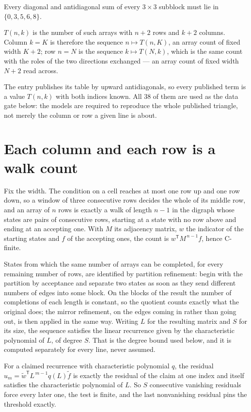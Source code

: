 \documentclass[11pt]{article}
\theoremstyle{definition}
\begin{document}
Every diagonal and antidiagonal sum of every $3\times3$ subblock must lie in $\{0, 3, 5, 6, 8\}$.

$T(n,k)$ is the number of such arrays with $n + 2$ rows and $k + 2$ columns. Column $k = K$ is therefore the sequence $n \mapsto T(n,K)$, an array count of fixed width $K + 2$; row $n = N$ is the sequence $k \mapsto T(N,k)$, which is the same count with the roles of the two directions exchanged --- an array count of fixed width $N + 2$ read across.

The entry publishes its table by upward antidiagonals, so every published term is a value $T(n,k)$ with both indices known. All 38 of them are used as the data gate below: the models are required to reproduce the whole published triangle, not merely the column or row a given line is about.

\section{Each column and each row is a walk count}

Fix the width. The condition on a cell reaches at most one row up and one row down, so a window of three consecutive rows decides the whole of its middle row, and an array of $n$ rows is exactly a walk of length $n-1$ in the digraph whose states are pairs of consecutive rows, starting at a state with no row above and ending at an accepting one. With $M$ its adjacency matrix, $w$ the indicator of the starting states and $f$ of the accepting ones, the count is $w^{\mathsf T}M^{\,n-1}f$, hence C-finite.

States from which the same number of arrays can be completed, for every remaining number of rows, are identified by partition refinement: begin with the partition by acceptance and separate two states as soon as they send different numbers of edges into some block. On the blocks of the result the number of completions of each length is constant, so the quotient counts exactly what the original does; the mirror refinement, on the edges coming in rather than going out, is then applied in the same way. Writing $L$ for the resulting matrix and $S$ for its size, the sequence satisfies the linear recurrence given by the characteristic polynomial of $L$, of degree $S$. That is the degree bound used below, and it is computed separately for every line, never assumed.

For a claimed recurrence with characteristic polynomial $q$, the residual $u_m = \tilde w^{\mathsf T}L^{\,m-1}q(L)\tilde f$ is exactly the residual of the claim at one index and itself satisfies the characteristic polynomial of $L$. So $S$ consecutive vanishing residuals force every later one, the test is finite, and the last nonvanishing residual pins the threshold exactly.
\end{document}
